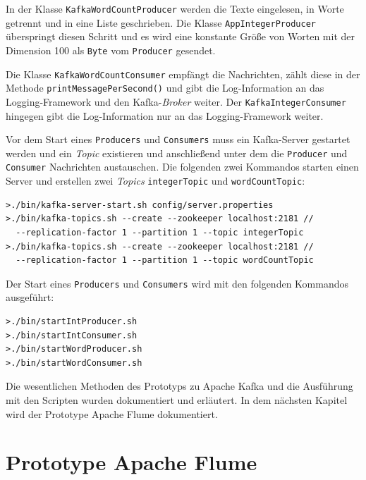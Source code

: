 In der Klasse \texttt{KafkaWordCountProducer} werden die Texte eingelesen, in Worte getrennt und in eine Liste geschrieben. Die Klasse \texttt{AppIntegerProducer} überspringt diesen Schritt und es wird eine konstante Größe von Worten mit der Dimension 100 als \texttt{Byte} vom \texttt{Producer} gesendet.

Die Klasse \texttt{KafkaWordCountConsumer} empfängt die Nachrichten, zählt diese in der Methode \texttt{printMessagePerSecond()} und gibt die Log-Information an das Logging-Framework und den Kafka-\textit{Broker} weiter. Der \texttt{KafkaIntegerConsumer} hingegen gibt die Log-Information nur an das Logging-Framework weiter.

Vor dem Start eines \texttt{Producers} und \texttt{Consumers} muss ein Kafka-Server gestartet werden und ein \textit{Topic} existieren und anschließend unter dem die \texttt{Producer} und \texttt{Consumer} Nachrichten austauschen. Die folgenden zwei Kommandos starten einen Server und erstellen zwei \textit{Topics} \texttt{integerTopic} und \texttt{wordCountTopic}:

\begin{verbatim}
>./bin/kafka-server-start.sh config/server.properties
>./bin/kafka-topics.sh --create --zookeeper localhost:2181 // 
  --replication-factor 1 --partition 1 --topic integerTopic
>./bin/kafka-topics.sh --create --zookeeper localhost:2181 // 
  --replication-factor 1 --partition 1 --topic wordCountTopic
\end{verbatim}

Der Start eines \texttt{Producers} und \texttt{Consumers} wird mit den folgenden Kommandos ausgeführt:

\begin{verbatim}
>./bin/startIntProducer.sh
>./bin/startIntConsumer.sh
>./bin/startWordProducer.sh
>./bin/startWordConsumer.sh
\end{verbatim}

Die wesentlichen Methoden des Prototyps zu Apache Kafka und die Ausführung mit den Scripten wurden dokumentiert und erläutert. In dem nächsten Kapitel wird der Prototype Apache Flume dokumentiert.


\section{Prototype Apache Flume}
\label{sec:prot:flume}

